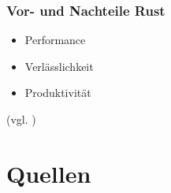 \documentclass{beamer}
\begin{document}
\begin{frame}[fragile]
  \frametitle{Vor- und Nachteile Rust}
  \begin{itemize}
    \item Performance
    \pause
    \item Verlässlichkeit
    \pause
    \item Produktivität
  \end{itemize}
  {\small (vgl. \cite{WhyRust})}
\end{frame}

\section{Quellen}
\begin{frame}
  
  \raggedright
  
\end{frame}
\end{document}
